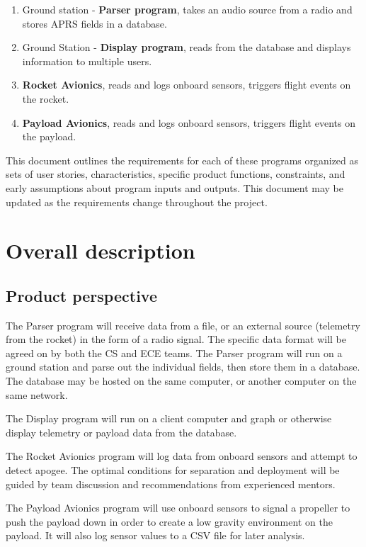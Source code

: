\documentclass[onecolumn, draftclsnofoot, 10pt, compsoc]{IEEEtran}
\begin{document}
\begin{enumerate}
\item Ground station - \textbf{Parser program}, takes an audio source from a radio and stores APRS fields in a database.
\item Ground Station - \textbf{Display program}, reads from the database and displays information to multiple users.
\item \textbf{Rocket Avionics}, reads and logs onboard sensors, triggers flight events on the rocket.
\item \textbf{Payload Avionics}, reads and logs onboard sensors, triggers flight events on the payload.
\end{enumerate}

This document outlines the requirements for each of these programs organized as sets of user stories, characteristics, specific product functions, constraints, and early assumptions about program inputs and outputs. This document may be updated as the requirements change throughout the project.

\section{Overall description}
\subsection{Product perspective}
The Parser program will receive data from a file, or an external source (telemetry from the rocket) in the form of a radio signal. The specific data format will be agreed on by both the CS and ECE teams.  The Parser program will run on a ground station and parse out the individual fields, then store them in a database. The database may be hosted on the same computer, or another computer on the same network.

The Display program will run on a client computer and graph or otherwise display telemetry or payload data from the database.

The Rocket Avionics program will log data from onboard sensors and attempt to detect apogee.  The optimal conditions for separation and deployment will be guided by team discussion and recommendations from experienced mentors.

The Payload Avionics program will use onboard sensors to signal a propeller to push the payload down in order to create a low gravity environment on the payload.  It will also log sensor values to a CSV file for later analysis.
\end{document}
